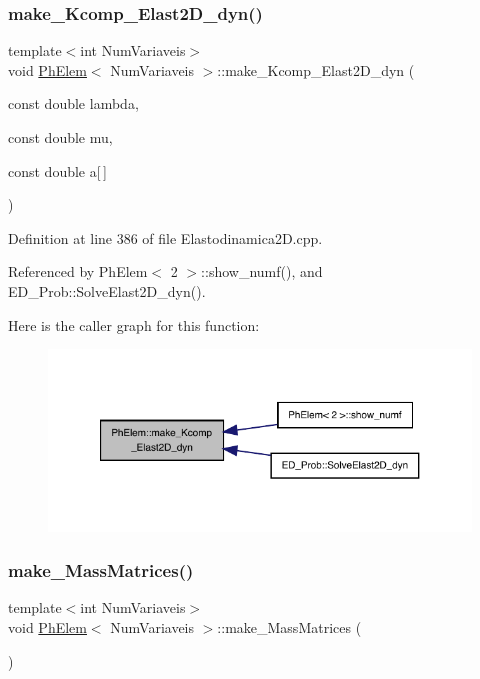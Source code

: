 \subsubsection{\texorpdfstring{make\+\_\+\+Kcomp\+\_\+\+Elast2\+D\+\_\+dyn()}{make\_Kcomp\_Elast2D\_dyn()}}
{\footnotesize\ttfamily template$<$int Num\+Variaveis$>$ \\
void \hyperlink{classPhElem}{Ph\+Elem}$<$ Num\+Variaveis $>$\+::make\+\_\+\+Kcomp\+\_\+\+Elast2\+D\+\_\+dyn (\begin{DoxyParamCaption}\item[{const double}]{lambda,  }\item[{const double}]{mu,  }\item[{const double}]{a\mbox{[}$\,$\mbox{]} }\end{DoxyParamCaption})}



Definition at line 386 of file Elastodinamica2\+D.\+cpp.



Referenced by Ph\+Elem$<$ 2 $>$\+::show\+\_\+numf(), and E\+D\+\_\+\+Prob\+::\+Solve\+Elast2\+D\+\_\+dyn().

Here is the caller graph for this function\+:
\nopagebreak
\begin{figure}[H]
\begin{center}
\leavevmode
\includegraphics[width=321pt]{classPhElem_a1ce74128a48a212028f644a68ce8edc0_icgraph}
\end{center}
\end{figure}
\mbox{\label{classPhElem_ae538fb941f4cedc88e27dd28f2460bb5}} 
\subsubsection{\texorpdfstring{make\+\_\+\+Mass\+Matrices()}{make\_MassMatrices()}}
{\footnotesize\ttfamily template$<$int Num\+Variaveis$>$ \\
void \hyperlink{classPhElem}{Ph\+Elem}$<$ Num\+Variaveis $>$\+::make\+\_\+\+Mass\+Matrices (\begin{DoxyParamCaption}{ }\end{DoxyParamCaption})}



